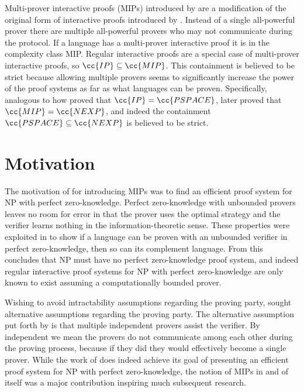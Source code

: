 
Multi-prover interactive proofs (MIPs) introduced by \cite{BGKW88} are a modification of the original form of interactive proofs introduced by \cite{GMR85}.
Instead of a single all-powerful prover there are multiple all-powerful provers who may not communicate during the protocol.
If a language has a multi-prover interactive proof it is in the complexity class MIP.
Regular interactive proofs are a special case of multi-prover interactive proofs, so $\cc{IP}\subseteq\cc{MIP}$.
This containment is believed to be strict because allowing multiple provers seems to significantly increase the power of the proof systems as far as what languages can be proven.
Specifically, analogous to how \cite{Sha92} proved that $\cc{IP}=\cc{PSPACE}$, later \cite{BFL91} proved that $\cc{MIP}=\cc{NEXP}$, and indeed the containment $\cc{PSPACE}\subseteq\cc{NEXP}$ is believed to be strict.


\section{Motivation}

The motivation of \cite{BGKW88} for introducing MIPs was to find an efficient proof system for NP with perfect zero-knowledge.
Perfect zero-knowledge with unbounded provers leaves no room for error in that the prover uses the optimal strategy and the verifier learns nothing in the information-theoretic sense. 
These properties were exploited in \cite{For87} to show if a language can be proven with an unbounded verifier in perfect zero-knowledge, then so can its complement language.
From this \cite{For87} concludes that NP must have no perfect zero-knowledge proof system, and indeed regular interactive proof systems for NP with perfect zero-knowledge are only known to exist assuming a computationally bounded prover.

Wishing to avoid intractability assumptions regarding the proving party, \cite{BGKW88} sought alternative assumptions regarding the proving party.
The alternative assumption put forth by \cite{BGKW88} is that multiple independent provers assist the verifier.
By independent we mean the provers do not communicate among each other during the proving process, because if they did they would effectively become a single prover.
While the work of \cite{BGKW88} does indeed achieve its goal of presenting an efficient proof system for NP with perfect zero-knowledge, the notion of MIPs in and of itself was a major contribution inspiring much subsequent research.


